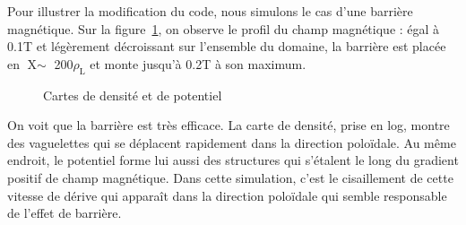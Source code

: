 \begin{refsection}
Pour illustrer la modification du code, nous simulons le cas d'une
barrière magnétique. Sur la
figure~\ref{2-CartesMagBarrier}, on observe le profil du champ magnétique : égal
à 0.1T et légèrement décroissant sur l'ensemble du domaine, la barrière est
placée en $\text{X}\sim$ 200$\rho_\text{L}$ et monte jusqu'à 0.2T à son maximum.

	\begin{figure}[!htbp]
    \centering
    \caption{Cartes de densité  et de potentiel
    }
    \label{2-CartesMagBarrier}
\end{figure}

On voit que la barrière est très efficace. La carte de densité, prise en log,
montre des vaguelettes qui se déplacent rapidement dans la direction poloïdale.
Au même endroit, le potentiel forme lui aussi des structures qui s'étalent le
long du gradient positif de champ magnétique. 
Dans cette simulation, c'est le cisaillement de cette vitesse de dérive qui
apparaît dans la direction poloïdale qui semble responsable de l'effet de
barrière. 



\end{refsection}
